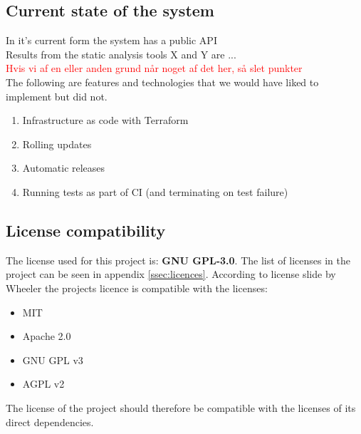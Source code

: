 \subsection{Current state of the system}

In it's current form the system has a public API \\ 

Results from the static analysis tools X and Y are ... \\ 


\textcolor{red}{Hvis vi af en eller anden grund når noget af det her, så slet punkter} \\
The following are features and technologies that we would have liked to implement but did not.

\begin{enumerate}
    \item Infrastructure as code with Terraform
    \item Rolling updates 
    \item Automatic releases
    \item Running tests as part of CI (and terminating on test failure)
\end{enumerate}



\subsection{License compatibility}
The license used for this project is: \textbf{GNU GPL-3.0}. The list of licenses in the project can be seen in appendix \ref{ssec:licences}. According to license slide by Wheeler\cite{LicenseComp} the projects licence is compatible with the licenses: 
\begin{itemize}
    \item MIT
    \item Apache 2.0
    \item GNU GPL v3
    \item AGPL v2 
\end{itemize}
The license of the project should therefore be compatible with the licenses of its direct dependencies.